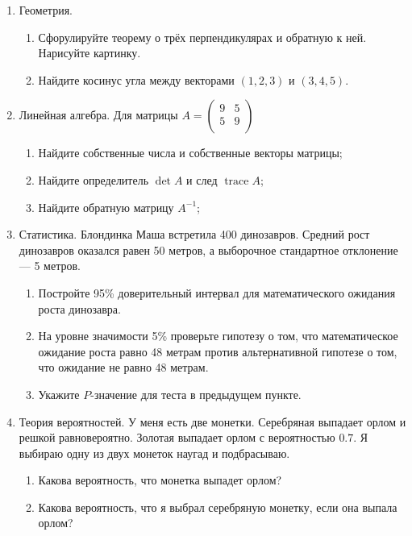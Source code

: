 \documentclass[12pt]{article}
\DeclareMathOperator{\tr}{trace}
\begin{document}
 



\begin{enumerate}

  \item Геометрия.
  \begin{enumerate}
    \item Сфорулируйте теорему о трёх перпендикулярах и обратную к ней. Нарисуйте картинку.
    \item Найдите косинус угла между векторами $(1, 2, 3)$ и $(3, 4, 5)$.
  \end{enumerate}
  

  \item Линейная алгебра. Для матрицы
$
  A=\begin{pmatrix}
  9 & 5  \\
  5 & 9  \\
  \end{pmatrix}
$

  \begin{enumerate}
  \item Найдите собственные числа и собственные векторы матрицы;
  \item Найдите определитель $\det A$ и след $\tr A$;
 \item Найдите обратную матрицу $A^{-1}$;
  \end{enumerate}


  \item Статистика. Блондинка Маша встретила 400 динозавров.
  Средний рост динозавров оказался равен 50 метров, а выборочное стандартное отклонение — 5 метров.

  \begin{enumerate}
    \item Постройте 95\% доверительный интервал для математического ожидания роста динозавра.
    \item На уровне значимости 5\% проверьте гипотезу о том, что математическое ожидание
    роста равно 48 метрам против альтернативной гипотезе о том, что ожидание не равно 48 метрам.
    \item Укажите $P$-значение для теста в предыдущем пункте.
  \end{enumerate}

 \item Теория вероятностей. У меня есть две монетки. Серебряная выпадает орлом и решкой равновероятно.
 Золотая выпадает орлом с вероятностью $0.7$. 
 Я выбираю одну из двух монеток наугад и подбрасываю.
 \begin{enumerate}
   \item Какова вероятность, что монетка выпадет орлом?
   \item Какова вероятность, что я выбрал серебряную монетку, если она выпала орлом?
 \end{enumerate}

\end{enumerate}
\end{document}
